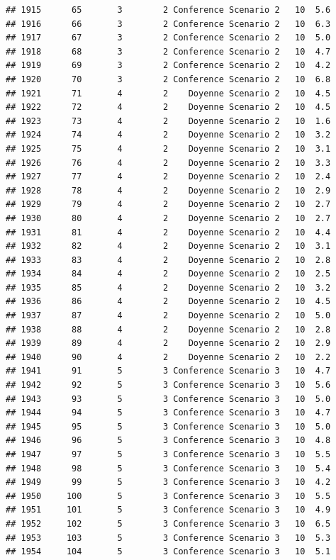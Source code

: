 \documentclass[
]{article}
\begin{document}
\begin{verbatim}
## 1915      65       3        2 Conference Scenario 2   10  5.6
## 1916      66       3        2 Conference Scenario 2   10  6.3
## 1917      67       3        2 Conference Scenario 2   10  5.0
## 1918      68       3        2 Conference Scenario 2   10  4.7
## 1919      69       3        2 Conference Scenario 2   10  4.2
## 1920      70       3        2 Conference Scenario 2   10  6.8
## 1921      71       4        2    Doyenne Scenario 2   10  4.5
## 1922      72       4        2    Doyenne Scenario 2   10  4.5
## 1923      73       4        2    Doyenne Scenario 2   10  1.6
## 1924      74       4        2    Doyenne Scenario 2   10  3.2
## 1925      75       4        2    Doyenne Scenario 2   10  3.1
## 1926      76       4        2    Doyenne Scenario 2   10  3.3
## 1927      77       4        2    Doyenne Scenario 2   10  2.4
## 1928      78       4        2    Doyenne Scenario 2   10  2.9
## 1929      79       4        2    Doyenne Scenario 2   10  2.7
## 1930      80       4        2    Doyenne Scenario 2   10  2.7
## 1931      81       4        2    Doyenne Scenario 2   10  4.4
## 1932      82       4        2    Doyenne Scenario 2   10  3.1
## 1933      83       4        2    Doyenne Scenario 2   10  2.8
## 1934      84       4        2    Doyenne Scenario 2   10  2.5
## 1935      85       4        2    Doyenne Scenario 2   10  3.2
## 1936      86       4        2    Doyenne Scenario 2   10  4.5
## 1937      87       4        2    Doyenne Scenario 2   10  5.0
## 1938      88       4        2    Doyenne Scenario 2   10  2.8
## 1939      89       4        2    Doyenne Scenario 2   10  2.9
## 1940      90       4        2    Doyenne Scenario 2   10  2.2
## 1941      91       5        3 Conference Scenario 3   10  4.7
## 1942      92       5        3 Conference Scenario 3   10  5.6
## 1943      93       5        3 Conference Scenario 3   10  5.0
## 1944      94       5        3 Conference Scenario 3   10  4.7
## 1945      95       5        3 Conference Scenario 3   10  5.0
## 1946      96       5        3 Conference Scenario 3   10  4.8
## 1947      97       5        3 Conference Scenario 3   10  5.5
## 1948      98       5        3 Conference Scenario 3   10  5.4
## 1949      99       5        3 Conference Scenario 3   10  4.2
## 1950     100       5        3 Conference Scenario 3   10  5.5
## 1951     101       5        3 Conference Scenario 3   10  4.9
## 1952     102       5        3 Conference Scenario 3   10  6.5
## 1953     103       5        3 Conference Scenario 3   10  5.3
## 1954     104       5        3 Conference Scenario 3   10  5.1

\end{verbatim}
\end{document}
